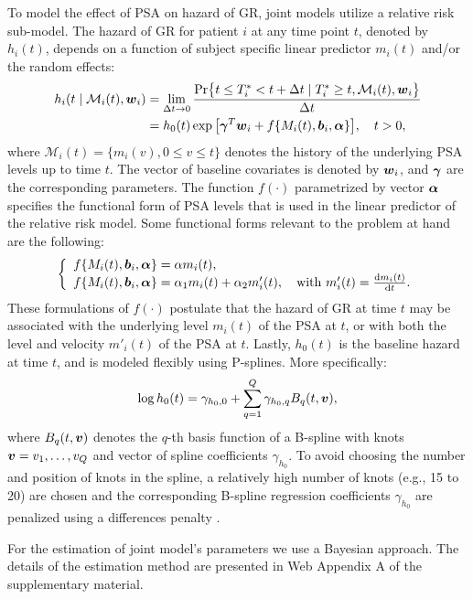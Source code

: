 To model the effect of PSA on hazard of GR, joint models utilize a relative risk sub-model. The hazard of GR for patient $i$ at any time point $t$, denoted by $h_i(t)$, depends on a function of subject specific linear predictor $m_i(t)$ and/or the random effects:
\begin{align*}
h_i(t \mid \mathcal{M}_i(t), \boldsymbol{w}_i) &= \lim_{\Delta t \to 0} \frac{\mbox{Pr}\big\{t \leq T^*_i < t + \Delta t \mid T^*_i \geq t, \mathcal{M}_i(t), \boldsymbol{w}_i\big\}}{\Delta t}\\
&=h_0(t) \exp\big[\boldsymbol{\gamma}^T\boldsymbol{w}_i + f\{M_i(t), \boldsymbol{b}_i, \boldsymbol{\alpha}\}\big], \quad t>0,
\end{align*}
where $\mathcal{M}_i(t) = \{m_i(v), 0\leq v \leq t\}$ denotes the history of the underlying PSA levels up to time $t$. The vector of baseline covariates is denoted by $\boldsymbol{w}_i$, and $\boldsymbol{\gamma}$ are the corresponding parameters. The function $f(\cdot)$ parametrized by vector $\boldsymbol{\alpha}$ specifies the functional form of PSA levels \citep{brown2009assessing,rizopoulos2012joint,taylor2013real,rizopoulos2014bma} that is used in the linear predictor of the relative risk model. Some functional forms relevant to the problem at hand are the following: 
\begin{eqnarray*}
\left \{
\begin{array}{l}
f\{M_i(t), \boldsymbol{b}_i, \boldsymbol{\alpha}\} = \alpha m_i(t),\\
f\{M_i(t), \boldsymbol{b}_i, \boldsymbol{\alpha}\} = \alpha_1 m_i(t) + \alpha_2 m'_i(t),\quad \text{with}\  m'_i(t) = \frac{\mathrm{d}{m_i(t)}}{\mathrm{d}{t}}.\\
\end{array}
\right.
\end{eqnarray*}
These formulations of $f(\cdot)$ postulate that the hazard of GR at time $t$ may be associated with the underlying level $m_i(t)$ of the PSA at $t$, or with both the level and velocity $m'_i(t)$ of the PSA at $t$. Lastly, $h_0(t)$ is the baseline hazard at time $t$, and is modeled flexibly using P-splines. More specifically:
\begin{equation*}
\log{h_0(t)} = \gamma_{h_0,0} + \sum_{q=1}^Q \gamma_{h_0,q} B_q(t, \boldsymbol{v}),
\end{equation*}
where $B_q(t, \boldsymbol{v})$ denotes the $q$-th basis function of a B-spline with knots $\boldsymbol{v} = v_1, \ldots, v_Q$ and vector of spline coefficients $\gamma_{h_0}$. To avoid choosing the number and position of knots in the spline, a relatively high number of knots (e.g., 15 to 20) are chosen and the corresponding B-spline regression coefficients $\gamma_{h_0}$ are penalized using a differences penalty \citep{eilers1996flexible}. 

For the estimation of joint model's parameters we use a Bayesian approach. The details of the estimation method are presented in Web Appendix A of the supplementary material.